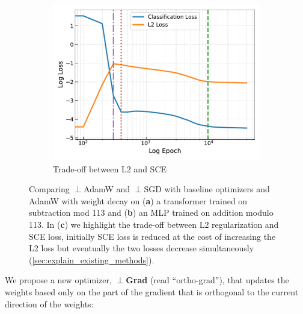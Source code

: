 \begin{figure}[t]
\hfill
\begin{subfigure}[t]{.32\textwidth}
  \centering
  \includegraphics[width=\linewidth]{grokking_iclr_arxiv/figures/l2_v_classification_loss.pdf}
  \caption{\vspace{-1.5mm}Trade-off between L2 and SCE}
  \label{fig:l2_vs_sce}
\end{subfigure}
\vspace{-1mm}
\caption{Comparing $\perp$AdamW and $\perp$SGD with baseline optimizers and AdamW with weight decay on (\textbf{a}) a transformer trained on subtraction mod 113 and  (\textbf{b}) an MLP trained on addition modulo 113. In (\textbf{c}) we highlight the trade-off between L2 regularization and SCE loss, initially SCE loss is reduced at the cost of increasing the L2 loss but eventually the two losses decrease simultaneously (\cref{sec:explain_existing_methods}). \vspace{-7mm}}
\end{figure}

We propose a new optimizer, $\perp$\textbf{Grad} (read ``ortho-grad''), that updates the weights based only on the part of the gradient that is orthogonal to the current direction of the weights:

